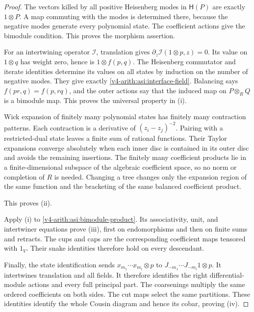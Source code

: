 \begin{proof}
The vectors killed by all positive Heisenberg modes in $\mathsf H(P)$
are exactly $1\otimes P$. A map commuting with the modes is determined
there, because the negative modes generate every polynomial state.
The coefficient actions give the bimodule condition. This proves the
morphism assertion.

For an intertwining operator $\mathcal I$, translation gives
$\partial_z\mathcal I(1\otimes p,z)=0$. Its value on $1\otimes q$ has
weight zero, hence is $1\otimes f(p,q)$. The Heisenberg commutator and
iterate identities determine its values on all states by induction on
the number of negative modes. They give exactly
\eqref{v4-arith:asi:interface-field}. Balancing says
$f(pr,q)=f(p,rq)$, and the outer actions say that the induced map on
$P\otimes_RQ$ is a bimodule map. This proves the universal property in
\textup{(i)}.

Wick expansion of finitely many polynomial states has finitely many
contraction patterns. Each contraction is a derivative of
$(z_i-z_j)^{-2}$. Pairing with a restricted-dual state leaves a finite
sum of rational functions. Their Taylor expansions converge absolutely
when each inner disc is contained in its outer disc and avoids the
remaining insertions. The finitely many coefficient products lie in a
finite-dimensional subspace of the algebraic coefficient space, so no
norm or completion of $R$ is needed. Changing a tree changes only the
expansion region of the same function and the bracketing of the same
balanced coefficient product.

This proves \textup{(ii)}.

Apply \textup{(i)} to \eqref{v4-arith:asi:bimodule-product}. Its associativity,
unit, and intertwiner equations prove \textup{(iii)}, first on
endomorphisms and then on finite sums and retracts. The cups and caps
are the corresponding coefficient maps tensored with $1_V$. Their
snake identities therefore hold on every descendant.

Finally, the state identification sends
$x_{m_1}\cdots x_{m_l}\otimes p$ to
$J_{-m_1}\cdots J_{-m_l}1\otimes p$.
It intertwines translation and all fields. It therefore identifies the
right differential-module actions and every full principal part.
The coarsenings multiply the same ordered coefficients on both sides.
The cut maps select the same partitions. These identities identify the
whole Cousin diagram and hence its cobar, proving \textup{(iv)}.
\end{proof}

